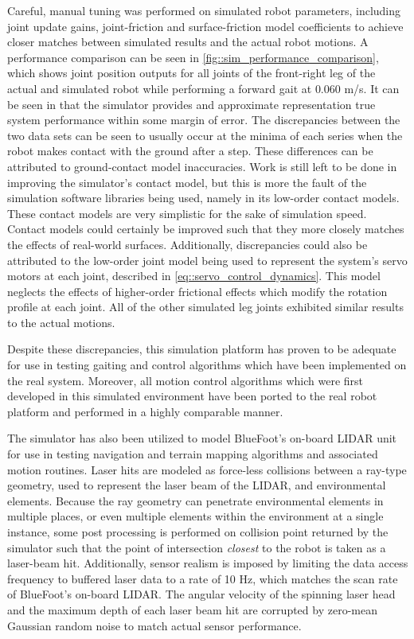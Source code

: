 		Careful, manual tuning was performed on simulated robot parameters, including joint update gains, joint-friction and surface-friction model coefficients to achieve closer matches between simulated results and the actual robot motions. A performance comparison can be seen in \ref{fig::sim_performance_comparison}, which shows joint position outputs for all joints of the front-right leg of the actual and simulated robot while performing a forward gait at $0.060$ m/s. It can be seen in  that the simulator provides and approximate representation true system performance within some margin of error. The discrepancies between the two data sets can be seen to usually occur at the minima of each series when the robot makes contact with the ground after a step. These differences can be attributed to ground-contact model inaccuracies. Work is still left to be done in improving the simulator's contact model, but this is more the fault of the simulation software libraries being used, namely in its low-order contact models. These contact models are very simplistic for the sake of simulation speed. Contact models could certainly be improved such that they more closely matches the effects of real-world surfaces. Additionally, discrepancies could also be attributed to the low-order joint model being used to represent the system's servo motors at each joint, described in \ref{eq::servo_control_dynamics}. This model neglects the effects of higher-order frictional effects which modify the rotation profile at each joint. All of the other simulated leg joints exhibited similar results to the actual motions.

		Despite these discrepancies, this simulation platform has proven to be adequate for use in testing gaiting and control algorithms which have been implemented on the real system. Moreover, all motion control algorithms which were first developed in this simulated environment have been ported to the real robot platform and performed in a highly comparable manner.

		The simulator has also been utilized to model BlueFoot's on-board LIDAR unit for use in testing navigation and terrain mapping algorithms and associated motion routines. Laser hits are modeled as force-less collisions between a ray-type geometry, used to represent the laser beam of the LIDAR, and environmental elements. Because the ray geometry can penetrate environmental elements in multiple places, or even multiple elements within the environment at a single instance, some post processing is performed on collision point returned by the simulator such that the point of intersection \emph{closest} to the robot is taken as a laser-beam hit. Additionally, sensor realism is imposed by limiting the data access frequency to buffered laser data to a rate of 10 Hz, which matches the scan rate of BlueFoot's on-board LIDAR. The angular velocity of the spinning laser head and the maximum depth of each laser beam hit are corrupted by zero-mean Gaussian random noise to match actual sensor performance.
